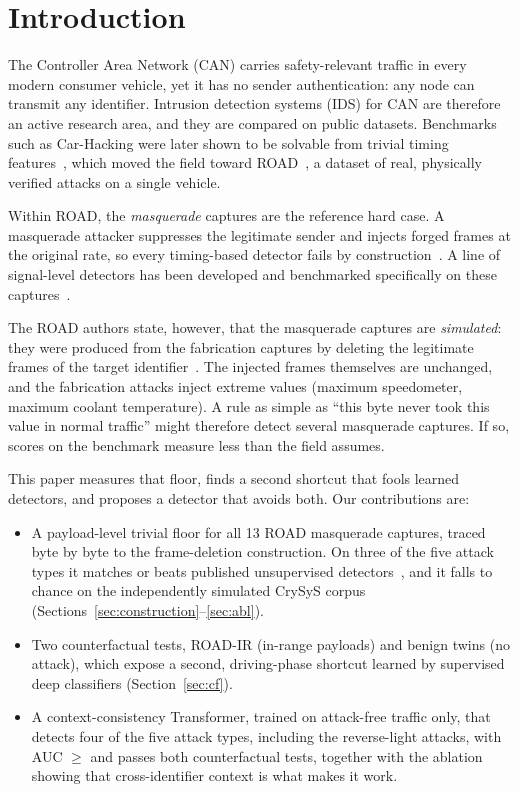 \documentclass[conference]{IEEEtran}
\begin{document}
\section{Introduction}
The Controller Area Network (CAN) carries safety-relevant traffic in every modern consumer vehicle, yet it has no sender authentication: any node can transmit any identifier. Intrusion detection systems (IDS) for CAN are therefore an active research area, and they are compared on public datasets. Benchmarks such as Car-Hacking were later shown to be solvable from trivial timing features~\cite{blevins2021,heydari2026}, which moved the field toward ROAD~\cite{verma2024}, a dataset of real, physically verified attacks on a single vehicle.

Within ROAD, the \emph{masquerade} captures are the reference hard case. A masquerade attacker suppresses the legitimate sender and injects forged frames at the original rate, so every timing-based detector fails by construction~\cite{blevins2021}. A line of signal-level detectors has been developed and benchmarked specifically on these captures~\cite{moriano2022,moriano2026jisa,marfo2025,liu2026mids,hegde2026}.

The ROAD authors state, however, that the masquerade captures are \emph{simulated}: they were produced from the fabrication captures by deleting the legitimate frames of the target identifier~\cite{verma2024}. The injected frames themselves are unchanged, and the fabrication attacks inject extreme values (maximum speedometer, maximum coolant temperature). A rule as simple as ``this byte never took this value in normal traffic'' might therefore detect several masquerade captures. If so, scores on the benchmark measure less than the field assumes.

This paper measures that floor, finds a second shortcut that fools learned detectors, and proposes a detector that avoids both. Our contributions are:
\begin{itemize}
\item A payload-level trivial floor for all 13 ROAD masquerade captures, traced byte by byte to the frame-deletion construction. On three of the five attack types it matches or beats published unsupervised detectors~\cite{moriano2026jisa}, and it falls to chance on the independently simulated CrySyS corpus (Sections~\ref{sec:construction}--\ref{sec:abl}).
\item Two counterfactual tests, ROAD-IR (in-range payloads) and benign twins (no attack), which expose a second, driving-phase shortcut learned by supervised deep classifiers (Section~\ref{sec:cf}).
\item A context-consistency Transformer, trained on attack-free traffic only, that detects four of the five attack types, including the reverse-light attacks, with AUC $\geq$\CtxFourMin{} and passes both counterfactual tests, together with the ablation showing that cross-identifier context is what makes it work.
\end{itemize}
\end{document}
